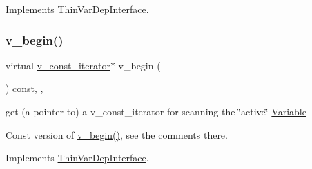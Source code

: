Implements \mbox{\hyperlink{group___thin_var_dep_interface___c_l_a_s_s_e_s_ga645ab1f1a40dea7fdcef536081c78613}{Thin\+Var\+Dep\+Interface}}.

\mbox{\label{class_s_m_spp__di__unipi__it_1_1_f_row_constraint_a997de10fbae309ac6e357d7ad96a8052}} 
\subsubsection{\texorpdfstring{v\+\_\+begin()}{v\_begin()}\hspace{0.1cm}{\footnotesize\ttfamily [2/2]}}
{\footnotesize\ttfamily virtual \mbox{\hyperlink{class_s_m_spp__di__unipi__it_1_1_thin_var_dep_interface_1_1v__const__iterator}{v\+\_\+const\+\_\+iterator}}$\ast$ v\+\_\+begin (\begin{DoxyParamCaption}\item[{void}]{ }\end{DoxyParamCaption}) const\hspace{0.3cm}{\ttfamily [inline]}, {\ttfamily [override]}, {\ttfamily [virtual]}}



get (a pointer to) a v\+\_\+const\+\_\+iterator for scanning the \char`\"{}active\char`\"{} \mbox{\hyperlink{class_s_m_spp__di__unipi__it_1_1_variable}{Variable}} 

Const version of \mbox{\hyperlink{class_s_m_spp__di__unipi__it_1_1_f_row_constraint_ad0b5bcf42a678385fdba6fe41ce9626b}{v\+\_\+begin()}}, see the comments there. 

Implements \mbox{\hyperlink{group___thin_var_dep_interface___c_l_a_s_s_e_s_ga6179496ecb66b6cc1504a50bcbb264e9}{Thin\+Var\+Dep\+Interface}}.

\mbox{\label{class_s_m_spp__di__unipi__it_1_1_f_row_constraint_ad17303c6335cb94a9d32f1fce77501fd}} 
